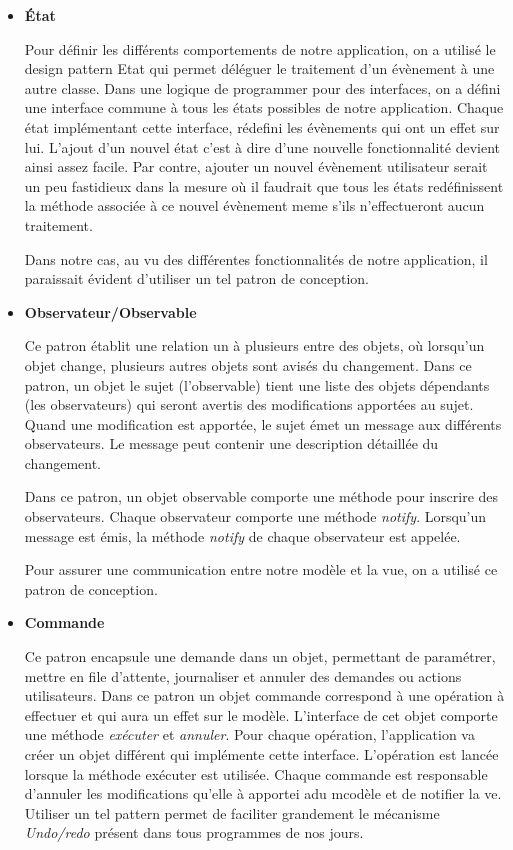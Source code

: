 \documentclass[10pt,a4paper]{book}
\begin{document}
\begin{itemize}
\item{\textbf{État}} 
	
Pour définir les différents comportements de notre application, on a utilisé le design pattern Etat qui permet déléguer le traitement d'un évènement à une autre classe. Dans une logique de programmer pour des interfaces, on a défini une interface commune à tous les états possibles de notre application. Chaque état implémentant cette interface, rédefini les évènements qui ont un effet sur lui. L'ajout d'un nouvel état c'est à dire d'une nouvelle fonctionnalité devient ainsi assez facile. Par contre, ajouter un nouvel évènement utilisateur serait un peu fastidieux dans la mesure où il faudrait que tous les états redéfinissent la méthode associée à ce nouvel évènement meme s'ils n'effectueront aucun traitement.

Dans notre cas, au vu des différentes fonctionnalités de notre application, il paraissait évident d'utiliser un tel patron de conception.	


\item \textbf{Observateur/Observable}
	
Ce patron établit une relation un à plusieurs entre des objets, où lorsqu'un objet change, plusieurs autres objets sont avisés du changement. Dans ce patron, un objet le sujet (l'observable) tient une liste des objets dépendants (les observateurs) qui seront avertis des modifications apportées au sujet. Quand une modification est apportée, le sujet émet un message aux différents observateurs. Le message peut contenir une description détaillée du changement. 

Dans ce patron, un objet observable comporte une méthode pour inscrire des observateurs. Chaque observateur comporte une méthode \textit{notify}. Lorsqu'un message est émis,  la méthode \textit{notify} de chaque observateur est appelée.

Pour assurer une communication entre notre modèle et la vue, on a utilisé ce patron de conception.

\item \textbf{Commande}

Ce patron encapsule une demande dans un objet, permettant de paramétrer, mettre en file d'attente, journaliser et annuler des demandes ou actions utilisateurs. Dans ce patron un objet commande correspond à une opération à effectuer et qui aura un effet sur le modèle. L'interface de cet objet comporte une méthode \textit{exécuter} et \textit{annuler}. Pour chaque opération, l'application va créer un objet différent qui implémente cette interface. L'opération est lancée lorsque la méthode exécuter est utilisée. Chaque commande est responsable d'annuler les modifications qu'elle à apportei adu mcodèle et de notifier la ve.  Utiliser un tel pattern permet de faciliter grandement le mécanisme \textit{Undo/redo} présent dans tous programmes de nos jours.


\end{itemize}
\end{document}
